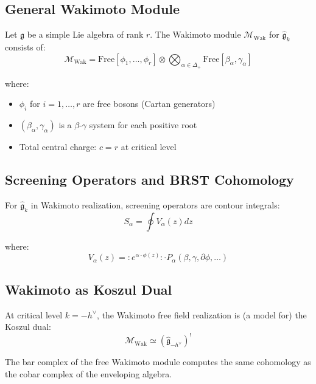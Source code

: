 \subsection{General Wakimoto Module}

\begin{theorem}
\label{thm:wakimoto-general}
Let $\mathfrak{g}$ be a simple Lie algebra of rank $r$. 
The Wakimoto module $\mathcal{M}_{\text{Wak}}$ for $\widehat{\mathfrak{g}}_k$ consists of:
$$\mathcal{M}_{\text{Wak}} = \text{Free}[\phi_1, \ldots, \phi_r] \otimes \bigotimes_{\alpha \in \Delta_+} \text{Free}[\beta_\alpha, \gamma_\alpha]$$

where:
\begin{itemize}
\item $\phi_i$ for $i = 1, \ldots, r$ are free bosons (Cartan generators)
\item $(\beta_\alpha, \gamma_\alpha)$ is a $\beta$-$\gamma$ system for each positive root
\item Total central charge: $c = r$ at critical level
\end{itemize}
\end{theorem}

\subsection{Screening Operators and BRST Cohomology}

\begin{definition}
\label{def:screening-operators}
For $\widehat{\mathfrak{g}}_k$ in Wakimoto realization, screening operators are 
contour integrals:
$$S_\alpha = \oint V_\alpha(z)dz$$

where:
$$V_\alpha(z) = :e^{\alpha \cdot \phi(z)}: \cdot P_\alpha(\beta, \gamma, \partial\phi, \ldots)$$
\end{definition}

\subsection{Wakimoto as Koszul Dual}

\begin{theorem}
\label{thm:wakimoto-koszul-dual}
At critical level $k = -h^{\vee}$, the Wakimoto free field realization is (a model for) 
the Koszul dual:
$$\mathcal{M}_{\text{Wak}} \simeq (\widehat{\mathfrak{g}}_{-h^\vee})^!$$

The bar complex of the free Wakimoto module computes the same cohomology as the cobar 
complex of the enveloping algebra.
\end{theorem}

